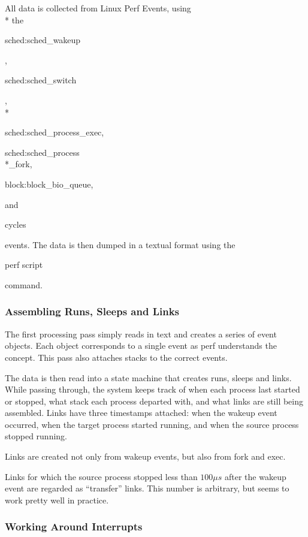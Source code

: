 \documentclass[10pt]{article}
\begin{document}

All data is collected from Linux Perf Events, using \\* the \begin{tt}sched:sched\_wakeup\end{tt}, \begin{tt}sched:sched\_switch\end{tt}, \\* \begin{tt}sched:sched\_process\_exec,\end{tt} \begin{tt}sched:sched\_process\\*\_fork,\end{tt} \begin{tt}block:block\_bio\_queue,\end{tt} and \begin{tt}cycles\end{tt} events.  The data is then dumped in a textual format using the \begin{tt}perf script\end{tt} command.


\subsubsection{Assembling Runs, Sleeps and Links}

The first processing pass simply reads in text and creates a series of event objects.  Each object corresponds to a single event as perf understands the concept.  This pass also attaches stacks to the correct events.

The data is then read into a  state machine that creates runs, sleeps and links.  While passing through, the system keeps track of when each process last started or stopped, what stack each process departed with, and what links are still being assembled.  Links have three timestamps attached: when the wakeup event occurred, when the target process started running, and when the source process stopped running.

Links are created not only from wakeup events, but also from fork and exec.

Links for which the source process stopped less than $100\mu s$ after the wakeup event are regarded as ``transfer'' links.  This number is arbitrary, but seems to work pretty well in practice.

\subsubsection{Working Around Interrupts}
\end{document}
